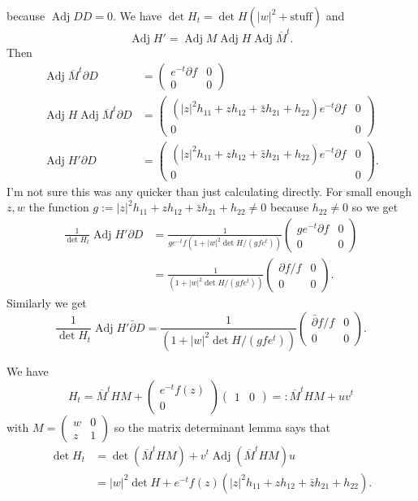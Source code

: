 \documentclass[10pt,a4paper]{amsart}
\def\ov#1{\overline{#1}}
\def\p{\partial}
\def\bp{\bar\partial}
\DeclareMathOperator{\Adj}{Adj}
\begin{document}
because $\operatorname{Adj} D D = 0$.
We have $\det H_t = \det H(|w|^2 + \text{stuff})$
and
$$
\Adj H' = \Adj M \Adj H \Adj \ov M^t.
$$
Then
\begin{align*}
\Adj \ov M^t
\p D
&= \begin{pmatrix}
e^{-t} \p f & 0
\\
0 & 0
\end{pmatrix}
\\
\Adj H \Adj \ov M^t \p D
&=
\begin{pmatrix}
(|z|^2 h_{11} + z h_{12} + \bar z h_{21} + h_{22})
e^{-t} \p f & 0
\\
0 & 0
\end{pmatrix}
\\
\Adj H' \p D
&=
\begin{pmatrix}
(|z|^2 h_{11} + z h_{12} + \bar z h_{21} + h_{22})
e^{-t} \p f & 0
\\
0 & 0
\end{pmatrix}.
\end{align*}
I'm not sure this was any quicker than just calculating directly.
For small enough $z,w$ the function
$g := |z|^2 h_{11} + z h_{12} + \bar z h_{21} + h_{22} \not= 0$
because $h_{22} \not= 0$ so we get
\begin{align*}
\frac{1}{\det H_t} \Adj H' \p D
&= \frac{1}{ge^{-t}f (1 + |w|^2 \det H/(gfe^t))} \begin{pmatrix}
g e^{-t} \p f & 0
\\
0 & 0
\end{pmatrix}
\\
&= \frac{1}{(1 + |w|^2 \det H/(gfe^t))} \begin{pmatrix}
\p f / f & 0
\\
0 & 0
\end{pmatrix}.
\end{align*}
Similarly we get
$$
\frac{1}{\det H_t} \Adj H' \bp D
= \frac{1}{(1 + |w|^2 \det H/(gfe^t))} \begin{pmatrix}
\bp f / f & 0
\\
0 & 0
\end{pmatrix}.
$$

We have
$$
H_t = \ov M^t H M
+ \begin{pmatrix} e^{-t} f(z) \\ 0 \end{pmatrix}
\begin{pmatrix} 1 & 0 \end{pmatrix}
=: \ov M^t H M + u v^t
$$
with $M = \begin{pmatrix} w & 0 \\ z & 1 \end{pmatrix}$
so the matrix determinant lemma says that
\begin{align*}
\det H_t
&= \det(\ov M^t H M)
+ v^t \operatorname{Adj} (\ov M^t H M) u
\\
&= |w|^2 \det H
+ e^{-t} f(z)
(|z|^2 h_{11} + z h_{12} + \bar z h_{21} + h_{22}).
\end{align*}
\end{document}
